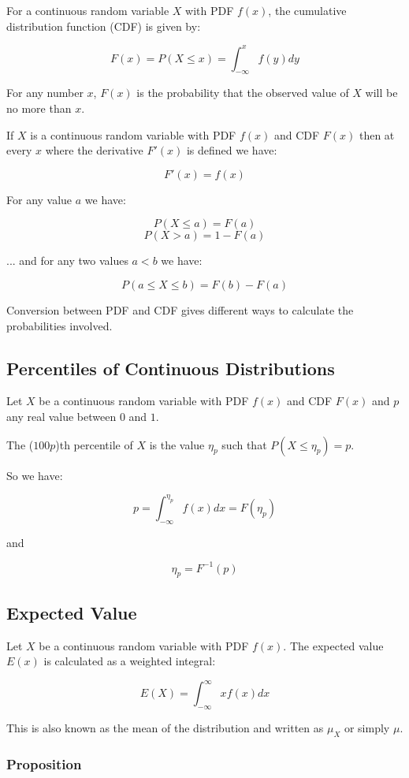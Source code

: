 For a continuous random variable $X$ with PDF $f(x)$, the cumulative distribution function (CDF) is given by:

$$ F(x) = P(X \leq x) = \int_{-\infty}^x f(y) dy $$

For any number $x$, $F(x)$ is the probability that the observed value of $X$ will be no more than $x$.

If $X$ is a continuous random variable with PDF $f(x)$ and CDF $F(x)$ then at every $x$ where the derivative $F'(x)$ is defined we have:

$$ F'(x) = f(x) $$

For any value $a$ we have:

$$ P(X \leq a) = F(a) $$
$$ P(X > a) = 1 - F(a) $$

... and for any two values $a < b$ we have:

$$ P(a \leq X \leq b) = F(b) - F(a) $$

Conversion between PDF and CDF gives different ways to calculate the probabilities involved.

\subsection*{Percentiles of Continuous Distributions}

Let $X$ be a continuous random variable with PDF $f(x)$ and CDF $F(x)$ and $p$ any real value between $0$ and $1$.

The ($100p$)th percentile of $X$ is the value $\eta_p$ such that $P(X \leq \eta_p) = p$.

So we have:

$$ p = \int_{-\infty}^{\eta_p} f(x) dx = F(\eta_p) $$

and

$$ \eta_p = F^{-1}(p) $$

\subsection*{Expected Value}

Let $X$ be a continuous random variable with PDF $f(x)$. The expected value $E(x)$ is calculated as a weighted integral:

$$ E(X) = \int_{-\infty}^{\infty} xf(x) dx $$

This is also known as the mean of the distribution and written as $\mu_X$ or simply $\mu$.

\subsubsection*{Proposition}

